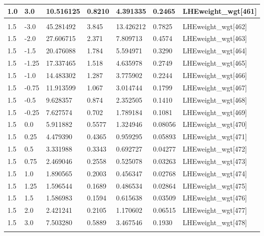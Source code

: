 \begin{table}[!htbp]
\begin{tabular}{lllllll}
   1.0  & 3.0   & 10.516125 & 0.8210        & 4.391335  & 0.2465       & LHEweight\_wgt[461]\\\hline
        &       &           &               &           &              & \\\hline
   1.5  & -3.0  & 45.281492 & 3.845         & 13.426212 & 0.7825       & LHEweight\_wgt[462]\\
   1.5  & -2.0  & 27.606715 & 2.371         & 7.809713  & 0.4574       & LHEweight\_wgt[463]\\
   1.5  & -1.5  & 20.476088 & 1.784         & 5.594971  & 0.3290       & LHEweight\_wgt[464]\\
   1.5  & -1.25 & 17.337465 & 1.518         & 4.635978  & 0.2749       & LHEweight\_wgt[465]\\
   1.5  & -1.0  & 14.483302 & 1.287         & 3.775902  & 0.2244       & LHEweight\_wgt[466]\\
   1.5  & -0.75 & 11.913599 & 1.067         & 3.014744  & 0.1799       & LHEweight\_wgt[467]\\
   1.5  & -0.5  & 9.628357  & 0.874         & 2.352505  & 0.1410       & LHEweight\_wgt[468]\\
   1.5  & -0.25 & 7.627574  & 0.702         & 1.789184  & 0.1081       & LHEweight\_wgt[469]\\
   1.5  & 0.0   & 5.911882  & 0.5577        & 1.324946  & 0.08056      & LHEweight\_wgt[470]\\
   1.5  & 0.25  & 4.479390  & 0.4365        & 0.959295  & 0.05893      & LHEweight\_wgt[471]\\
   1.5  & 0.5   & 3.331988  & 0.3343        & 0.692727  & 0.04277      & LHEweight\_wgt[472]\\
   1.5  & 0.75  & 2.469046  & 0.2558        & 0.525078  & 0.03263      & LHEweight\_wgt[473]\\
   1.5  & 1.0   & 1.890565  & 0.2003        & 0.456347  & 0.02768      & LHEweight\_wgt[474]\\
   1.5  & 1.25  & 1.596544  & 0.1689        & 0.486534  & 0.02864      & LHEweight\_wgt[475]\\
   1.5  & 1.5   & 1.586983  & 0.1594        & 0.615638  & 0.03509      & LHEweight\_wgt[476]\\
   1.5  & 2.0   & 2.421241  & 0.2105        & 1.170602  & 0.06515      & LHEweight\_wgt[477]\\
   1.5  & 3.0   & 7.503280  & 0.5889        & 3.467546  & 0.1930       & LHEweight\_wgt[478]\\\hline
        &       &           &               &           & \\ \hline

\end{tabular}
\end{table}
